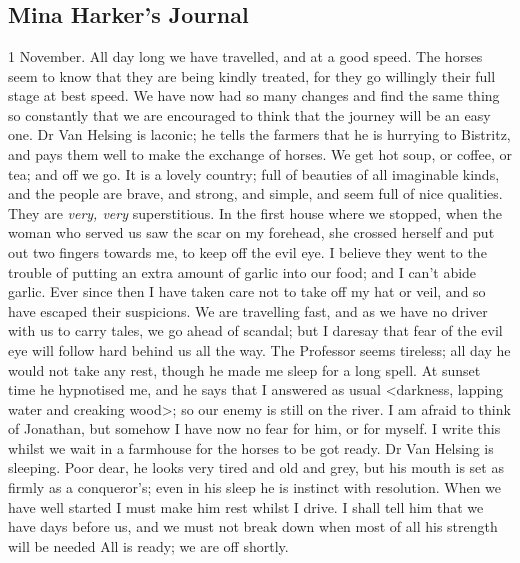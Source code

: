 \chapter[Chapter \thechapter]{}

\section{Mina Harker's Journal}
\begin{diary}{1 November.}
All day long we have travelled, and at a good speed. The horses seem to know that they are being kindly treated, for they go willingly their full stage at best speed. We have now had so many changes and find the same thing so constantly that we are encouraged to think that the journey will be an easy one. Dr Van Helsing is laconic; he tells the farmers that he is hurrying to Bistritz, and pays them well to make the exchange of horses. We get hot soup, or coffee, or tea; and off we go. It is a lovely country; full of beauties of all imaginable kinds, and the people are brave, and strong, and simple, and seem full of nice qualities. They are \textit{very, very} superstitious. In the first house where we stopped, when the woman who served us saw the scar on my forehead, she crossed herself and put out two fingers towards me, to keep off the evil eye. I believe they went to the trouble of putting an extra amount of garlic into our food; and I can't abide garlic. Ever since then I have taken care not to take off my hat or veil, and so have escaped their suspicions. We are travelling fast, and as we have no driver with us to carry tales, we go ahead of scandal; but I daresay that fear of the evil eye will follow hard behind us all the way. The Professor seems tireless; all day he would not take any rest, though he made me sleep for a long spell. At sunset time he hypnotised me, and he says that I answered as usual <darkness, lapping water and creaking wood>; so our enemy is still on the river. I am afraid to think of Jonathan, but somehow I have now no fear for him, or for myself. I write this whilst we wait in a farmhouse for the horses to be got ready. Dr Van Helsing is sleeping. Poor dear, he looks very tired and old and grey, but his mouth is set as firmly as a conqueror's; even in his sleep he is instinct with resolution. When we have well started I must make him rest whilst I drive. I shall tell him that we have days before us, and we must not break down when most of all his strength will be needed All is ready; we are off shortly.
	\end{diary}

